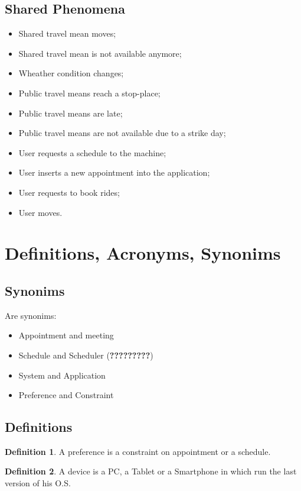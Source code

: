 \subsection{Shared Phenomena}
\begin{itemize}
\item Shared travel mean moves;
\item Shared travel mean is not available anymore;
\item Wheather condition changes;
\item Public travel means reach a stop-place;
\item Public travel means are late; 
\item Public travel means are not available due to a strike day;
\item User requests a schedule to the machine;
\item User inserts a new appointment into the application;
\item User requests to book rides;
\item User moves.
\end{itemize}

\section{Definitions, Acronyms, Synonims}

\subsection{Synonims}
Are synonims:
\begin{itemize}
\item Appointment and meeting
\item Schedule and Scheduler (\textbf{?????????})
\item System and Application
\item Preference and Constraint
\end{itemize}

\subsection{Definitions}
\theoremstyle{definition}
\newtheorem{definition}{Definition}[section]
 
\begin{definition}
A preference is a constraint on appointment or a schedule.
\end{definition}

\begin{definition}
A device is a PC, a Tablet or a Smartphone in which run the last version of his O.S.
\end{definition}

